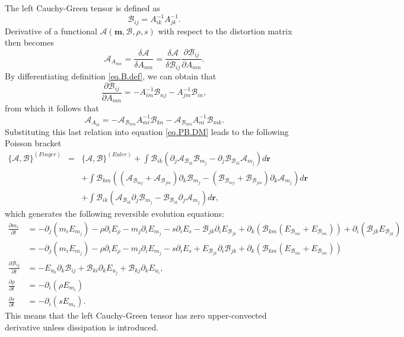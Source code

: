 \documentclass[twoside]{article}
\newcommand{\rr}{{\boldsymbol{r}}}
\newcommand{\mm}{{\boldsymbol{m}}}
\newcommand{\BBB}{{\mathcal{B}}}
\newcommand{\BBBB}{{\bm{\mathcal{B}}}}
\newcommand{\ted}{E} %
\newcommand{\AF}{\mathscr{A}}
\newcommand{\BF}{\mathscr{B}}
\newcommand{\pd}{\partial}
\begin{document}
The left Cauchy-Green tensor is defined as
\begin{equation}\label{eq.B.def}
\BBB_{ij} = A^{-1}_{ik} A^{-1}_{jk}.
\end{equation}
Derivative of 
a functional $\AF(\mm,\BBBB, \rho, s)$ 
with respect to the distortion matrix then becomes
\begin{equation}
\AF_{A_{mn}} = \frac{\delta \AF}{\delta A_{mn}}=\frac{\delta \AF}{\delta 
\BBB_{ij}}\frac{\pd 
\BBB_{ij}}{\pd  A_{mn}}.
\end{equation}
By differentiating definition \eqref{eq.B.def}, we can obtain that 
\begin{equation}
\frac{\pd \BBB_{ij}}{\pd A_{mn}} = -A^{-1}_{im}\BBB_{nj} - 
A^{-1}_{jm}\BBB_{in},
\end{equation}
from which it follows that
\begin{equation}
\AF_{A_{ik}} = -\AF_{\BBB_{mn}}A^{-1}_{mi}\BBB_{kn} - \AF_{\BBB_{mn}}A^{-1}_{ni}\BBB_{mk}.
\end{equation}
Substituting this last relation into equation \eqref{eq.PB.DM} leads to the 
following Poisson 
bracket
\begin{eqnarray}\label{eq.PB.B}
\{\AF,\BF\}^{(Finger)} &=& \{\AF,\BF\}^{(Euler)} + \int \BBB_{ik} \left(\pd_j 
\AF_{\BBB_{ik}} \BF_{m_j}-\pd_j \BF_{\BBB_{ik}} \AF_{m_j}\right) d\rr \nonumber\\
&&+\int \BBB_{km}\left(\left(\AF_{\BBB_{mj}}+\AF_{\BBB_{jm}}\right)\pd_k 
\BF_{m_j}-\left(\BF_{\BBB_{mj}}+\BF_{\BBB_{jm}}\right)\pd_k 
\AF_{m_j}\right) d\rr \nonumber\\
&&+\int \BBB_{ik}\left(\AF_{\BBB_{ik}} \pd_j \BF_{m_j}-\BF_{\BBB_{ik}} \pd_j 
\AF_{m_j}\right) d\rr,
\end{eqnarray}
which generates the following reversible evolution equations:
\begin{subequations}\label{eq.evo.B}
\begin{align}
\frac{\pd m_i}{\pd t} &= 
-\pd_j(m_i \ted_{m_j}) - \rho\pd_i \ted_\rho -m_j 
\pd_i \ted_{m_j} - s\pd_i \ted_s 
-\BBB_{jk}\pd_i \ted_{\BBB_{jk}} 
+\pd_k\left(\BBB_{km}(\ted_{\BBB_{mi}}+\ted_{\BBB_{im}})\right)
+\pd_i \left(\BBB_{jk}\ted_{\BBB_{jk}}\right)\\[1mm]
&=-\pd_j(m_i \ted_{m_j}) - \rho\pd_i \ted_\rho -m_j 
\pd_i \ted_{m_j} - s\pd_i \ted_s 
+ \ted_{\BBB_{jk}}\pd_i \BBB_{jk}
+\pd_k\left(\BBB_{km}(\ted_{\BBB_{mi}}+\ted_{\BBB_{im}})\right)
\\[1mm]
\frac{\pd \BBB_{ij}}{\pd t} &= -\ted_{u_k}\pd_k \BBB_{ij} 
+\BBB_{ki}\pd_k \ted_{u_j} + \BBB_{kj} \pd_k \ted_{u_i},\\[1mm]
\frac{\pd \rho}{\pd t} &= -\pd_i(\rho \ted_{m_i})\\
\frac{\pd s}{\pd t} &= -\pd_i(s \ted_{m_i}).
\end{align}
\end{subequations}
This means that the left Cauchy-Green tensor has zero upper-convected derivative
unless dissipation is introduced.
\end{document}
